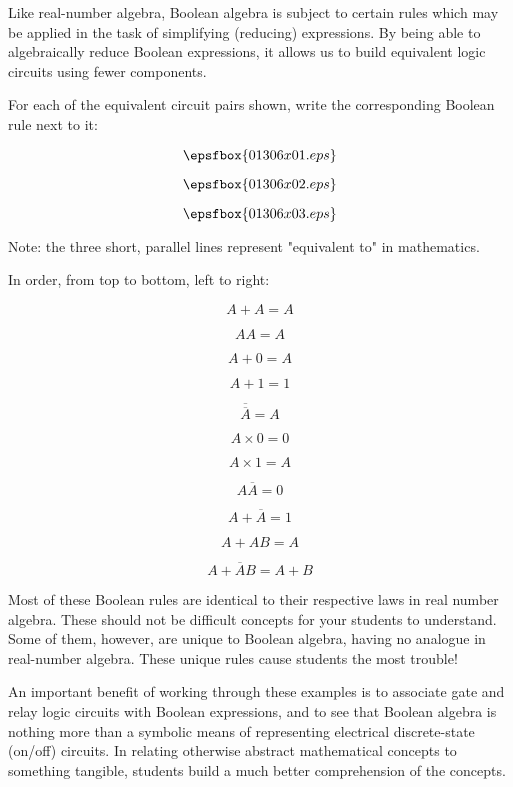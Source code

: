 

Like real-number algebra, Boolean algebra is subject to certain rules which may be applied in the task of simplifying (reducing) expressions.  By being able to algebraically reduce Boolean expressions, it allows us to build equivalent logic circuits using fewer components.

For each of the equivalent circuit pairs shown, write the corresponding Boolean rule next to it:

$$\epsfbox{01306x01.eps}$$

$$\epsfbox{01306x02.eps}$$

$$\epsfbox{01306x03.eps}$$

Note: the three short, parallel lines represent "equivalent to" in mathematics.







In order, from top to bottom, left to right:

$$A + A = A$$

$$AA = A$$

$$A + 0 = A$$

$$A + 1 = 1$$

$$\overline{\overline{A}} = A$$

$$A \times 0 = 0$$

$$A \times 1 = A$$

$$A \overline{A} = 0$$

$$A + \overline{A} = 1$$

$$A + AB = A$$

$$A + \overline{A}B = A + B$$







Most of these Boolean rules are identical to their respective laws in real number algebra.  These should not be difficult concepts for your students to understand.  Some of them, however, are unique to Boolean algebra, having no analogue in real-number algebra.  These unique rules cause students the most trouble!

An important benefit of working through these examples is to associate gate and relay logic circuits with Boolean expressions, and to see that Boolean algebra is nothing more than a symbolic means of representing electrical discrete-state (on/off) circuits.  In relating otherwise abstract mathematical concepts to something tangible, students build a much better comprehension of the concepts.




